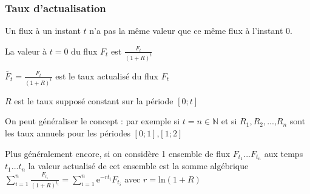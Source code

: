 \documentclass{report}
\begin{document}

\subsubsection{Taux d'actualisation}

Un flux à un instant $t$ n'a pas la même valeur que ce même flux à l'instant $0$.

La valeur à $t=0$ du flux $F_t$ est $\displaystyle\frac{F_t}{(1+R)^t}$

$\tilde{F_t} = \displaystyle\frac{F_t}{(1+R)^t}$ est le taux actualisé du flux $F_t$

$R$ est le taux supposé constant sur la période $[0;t]$

On peut généraliser le concept : par exemple si $t=n \in \mathbb{N}$ et si $R_1,R_2,\mbox{...,}R_n$ sont les taux annuels pour les périodes $[0;1]$,$[1;2]$

Plus généralement encore, si on considère 1 ensemble de flux $F_t_1...F_t_n$ aux temps $t_1...t_n$ la valeur actualisé de cet ensemble est la somme algébrique $\displaystyle\sum^n_{i=1}\frac{F_t_i}{(1+R)^{t_i}} = \displaystyle\sum^n_{i=1} \mbox{e}^{-rt_i}F_t_i$ avec $r = \mbox{ln}(1+R)$
\end{document}

